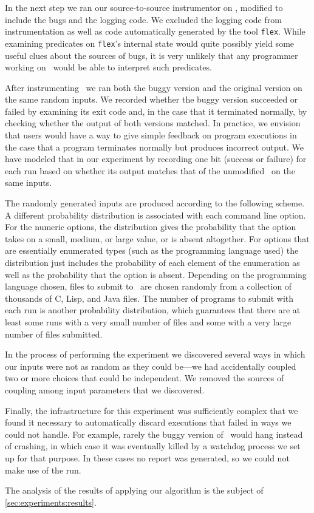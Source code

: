 In the next step we ran our source-to-source instrumentor on \moss,
modified to include the bugs and the logging code.  We excluded the logging
code from instrumentation as well as code automatically generated by the tool
{\tt flex}.  While examining predicates on {\tt flex}'s internal state
would quite possibly yield some useful clues about the sources of
bugs, it is very unlikely that any programmer working on \moss\ would
be able to interpret such predicates.

After instrumenting \moss\ we ran both the buggy version and the
original version on the same random inputs. We recorded whether the buggy
version succeeded or failed by examining its exit code and, in the
case that it terminated normally, by checking whether the output of
both versions matched.  In practice, we envision that users would have
a way to give simple feedback on program executions in the case that a
program terminates normally but produces incorrect output.  We have
modeled that in our experiment by recording one bit (success or
failure) for each run based on whether its output matches that of the
unmodified \moss\ on the same inputs.

The randomly generated inputs are produced according to the following
scheme.  A different probability distribution is associated with each
command line option.  For the numeric options, the distribution gives
the probability that the option takes on a small, medium, or large
value, or is absent altogether.  For options that are essentially
enumerated types (such as the programming language used) the
distribution just includes the probability of each element of the
enumeration as well as the probability that the option is absent.
Depending on the programming language chosen, files to submit to
\moss\ are chosen randomly from a collection of thousands of C, Lisp,
and Java files.  The number of programs to submit with each run is
another probability distribution, which guarantees that there are at
least some runs with a very small number of files and some with a very
large number of files submitted.

In the process of performing the experiment we discovered several ways
in which our inputs were not as random as they could be---we had
accidentally coupled two or more choices that could be independent.
We removed the sources of coupling among input parameters that we
discovered.

Finally, the infrastructure for this experiment was sufficiently complex
that we found it necessary to automatically discard executions that
failed in ways we could not handle.  For example, rarely the buggy version of
\moss\ would hang instead of crashing, in which case it was eventually killed
by a watchdog process we set up for that purpose.  In these cases no report
was generated, so we could not make use of the run.

The analysis of the results of applying our algorithm is the
subject of \autoref{sec:experiments:results}.

